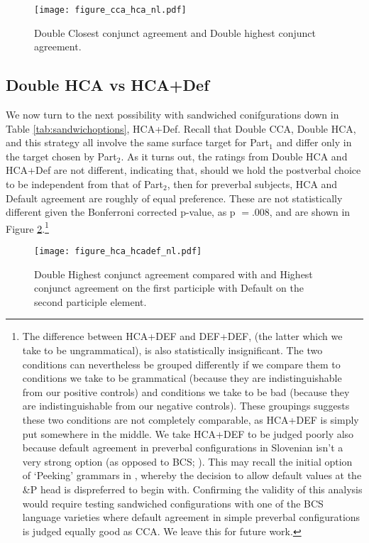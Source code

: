 \documentclass[output=paper
,modfonts
,nonflat]{langsci/langscibook}
\begin{document}
\begin{figure}[h]
\begin{center}
\texttt{[image: figure\_cca\_hca\_nl.pdf]}
\end{center}
\caption{Double Closest conjunct agreement and Double highest conjunct agreement.}
\label{fig:figure_cca_hca}
\end{figure}



\subsection{Double HCA vs HCA+Def}
We now turn to the next possibility with sandwiched conifgurations down in Table \ref{tab:sandwichoptions}, HCA+Def. Recall that Double CCA, Double HCA, and this strategy all involve the same surface target for Part$_1$ and differ only in the target chosen by Part$_2$. As it turns out, the ratings from Double HCA and HCA+Def are not different, indicating that, should we hold the postverbal choice to be independent from that of Part$_2$, then for preverbal subjects, HCA and Default agreement are roughly of equal preference. These are not statistically different given the Bonferroni corrected p-value, as p $=$.008, and are shown in Figure \ref{fig:figure_hca_hcadef}.\footnote{The difference between HCA+DEF and DEF+DEF, (the latter which we take to be ungrammatical), is also statistically insignificant. The two conditions can nevertheless be grouped differently if we compare them to conditions  we take to be grammatical (because they are indistinguishable from our positive controls) and conditions we take to be bad (because they are indistinguishable from our negative controls). These groupings suggests these two conditions are not completely comparable, as HCA+DEF is simply put somewhere in the middle. We take HCA+DEF to be judged poorly also because default agreement in preverbal configurations in Slovenian isn’t a very strong option (as opposed to BCS; \citealt{willergold:16}). This may recall the initial option of `Peeking' grammars in \cite{marusicnevinsbadecker:15}, whereby the decision to allow default values at the \&P head is dispreferred to begin with. Confirming the validity of this analysis would require testing sandwiched configurations with one of the BCS language varieties where default agreement in simple preverbal configurations is judged equally good as CCA. We leave this for future work.}


\begin{figure}[!h]
\begin{center}
\texttt{[image: figure\_hca\_hcadef\_nl.pdf]}
\end{center}
\caption{Double Highest conjunct agreement compared with and Highest conjunct agreement on the first participle with Default on the second participle element.}
\label{fig:figure_hca_hcadef}
\end{figure}
\end{document}
